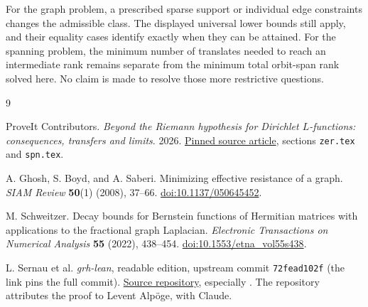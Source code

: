 \documentclass[11pt]{article}
\theoremstyle{remark}
\begin{document}
For the graph problem, a prescribed sparse support or individual edge
constraints changes the admissible class. The displayed universal lower
bounds still apply, and their equality cases identify exactly when they
can be attained. For the spanning problem, the minimum number of
translates needed to reach an intermediate rank remains separate from the
minimum total orbit-span rank solved here. No claim is made to resolve
those more restrictive questions.

\begin{thebibliography}{9}
\raggedright
{}
ProveIt Contributors.
\emph{Beyond the Riemann hypothesis for Dirichlet $L$-functions:
consequences, transfers and limits}. 2026.
\href{https://github.com/VladimirReshetnikov/ProveIt/tree/3d8689ceae76501a5c50f67da37e85369aac4fb6/Analysis/GeneralizedRiemannHypothesis/Article}{Pinned source article},
sections \texttt{zer.tex} and \texttt{spn.tex}.

A. Ghosh, S. Boyd, and A. Saberi.
Minimizing effective resistance of a graph.
\emph{SIAM Review} \textbf{50}(1) (2008), 37--66.
\href{https://doi.org/10.1137/050645452}{doi:10.1137/050645452}.

M. Schweitzer.
Decay bounds for Bernstein functions of Hermitian matrices with
applications to the fractional graph Laplacian.
\emph{Electronic Transactions on Numerical Analysis} \textbf{55}
(2022), 438--454.
\href{https://doi.org/10.1553/etna_vol55s438}{doi:10.1553/etna\_vol55s438}.

L. Sernau et al.
\emph{grh-lean}, readable edition, upstream commit
\texttt{72fead102f} (the link pins the full commit).
\href{https://github.com/lsernau/grh-lean/tree/72fead102f663d5c7a407964a13dc0cf9d977207/grh}{Source repository},
especially .
The repository attributes the proof to Levent Alp\"oge, with Claude.
\end{thebibliography}
\end{document}
